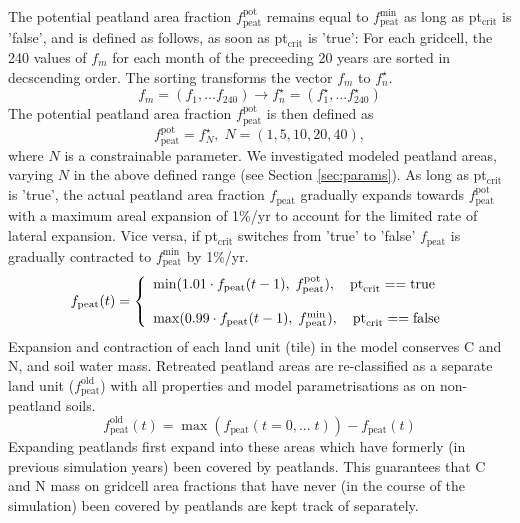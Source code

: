 The potential peatland area fraction $f_{\text{peat}}^{\text{pot}}$ remains equal to $f_{\text{peat}}^{\text{min}}$ as long as pt$_{\text{crit}}$ is 'false', and is defined as follows, as soon as pt$_{\text{crit}}$ is 'true': For each gridcell, the 240 values of $f_m$ for each month of the preceeding 20 years are sorted in decscending order. The sorting transforms the vector $f_m$ to $f^{\star}_n$.
\begin{equation}
f_m=(f_1, ... f_{240}) \rightarrow f^{\star}_n=(f^{\star}_1, ... f^{\star}_{240})
\end{equation}
The potential peatland area fraction $f_{\text{peat}}^{\text{pot}}$ is then defined as
\begin{equation}
f_{\text{peat}}^{\text{pot}} = f_N^{\star},\;N=(1,5,10,20,40),
\label{eq:plftune}
\end{equation}
where $N$ is a constrainable parameter. We investigated modeled peatland areas, varying $N$ in the above defined range (see Section \ref{sec:params}). As long as pt$_{\text{crit}}$ is 'true', the actual peatland area fraction $f_{\text{peat}}$ gradually expands towards $f_{\text{peat}}^{\text{pot}}$ with a maximum areal expansion of 1\%/yr to account for the limited rate of lateral expansion. Vice versa, if pt$_{\text{crit}}$ switches from 'true' to 'false' $f_{\text{peat}}$ is gradually contracted to $f_{\text{peat}}^{\text{min}}$ by 1\%/yr.
\begin{equation}
f_{\text{peat}}(t) = \left\{
\begin{array}{l l}
    \min(1.01 \cdot f_{\text{peat}}(t-1),\;f_{\text{peat}}^{\text{pot}}), \quad \text{pt}_{\text{crit}}==\text{true}\\
    \\
    \max(0.99 \cdot f_{\text{peat}}(t-1),\;f_{\text{peat}}^{\text{min}}), \quad \text{pt}_{\text{crit}}==\text{false}\\
\end{array} 
\right.
\end{equation}
Expansion and contraction of each land unit (tile) in the model conserves C and N, and soil water mass. Retreated peatland areas are re-classified as a separate land unit ($f_{\text{peat}}^{\text{old}}$) with all properties and model parametrisations as on non-peatland soils.
\begin{equation}
 f_{\text{peat}}^{\text{old}}(t) = \max(f_{\text{peat}}(t=0,...\;t)) - f_{\text{peat}}(t) 
\end{equation}
Expanding peatlands first expand into these areas which have formerly (in previous simulation years) been covered by peatlands. This guarantees that C and N mass on gridcell area fractions that have never (in the course of the simulation) been covered by peatlands are kept track of separately.


